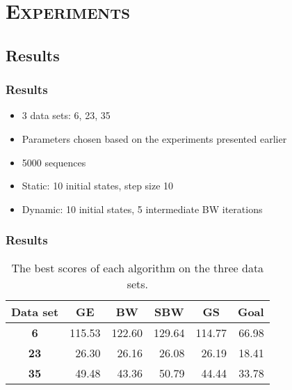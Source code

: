 \section{\scshape Experiments}
\subsection{Results}

\begin{frame}
  \frametitle{Results}
  \begin{itemize}
  	\item 3 data sets: 6, 23, 35
  	\item Parameters chosen based on the experiments presented earlier
  	\item 5000 sequences
  	\item Static: 10 initial states, step size 10
  	\item Dynamic: 10 initial states, 5 intermediate BW iterations
  \end{itemize}
\end{frame}

\begin{frame}
  \frametitle{Results} 
  \begin{center}
	\begin{table}[h]
		\centering
		\begin{tabular}{|c|r|r|r|r|r|}
		\hline
		Data set    & \multicolumn{1}{c|}{\textbf{GE}} & \multicolumn{1}{c|}{\textbf{BW}} & \multicolumn{1}{c|}{\textbf{SBW}} & \multicolumn{1}{c|}{\textbf{GS}} & \multicolumn{1}{c|}{\textbf{Goal}} \\ \hline
\textbf{6}  & 115.53                           & 122.60                           & 129.64                            & 114.77                           & 66.98                              		\\ \hline
		\textbf{23} & 26.30                            & 26.16                            & 26.08                             & 26.19                            & 18.41                              		\\ \hline
		\textbf{35} & 49.48                            & 43.36                            & 50.79                             & 44.44                            & 33.78                              		\\ \hline
		\end{tabular}
	\caption{The best scores of each algorithm on the three data sets.}
	\label{table:pautomac-best-score}
	\end{table}
  \end{center}
\end{frame}
	
